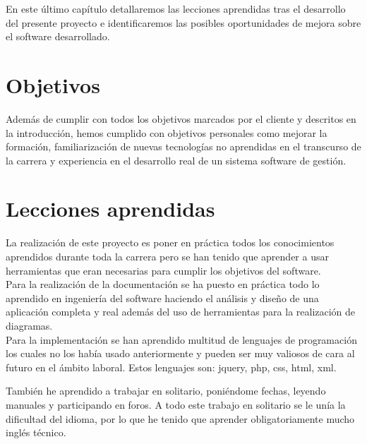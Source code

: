 

En este último capítulo detallaremos las lecciones aprendidas tras el desarrollo del presente proyecto e identificaremos las posibles oportunidades de mejora sobre el software desarrollado.

\section{Objetivos}

Además de cumplir con todos los objetivos marcados por el cliente y descritos en la introducción, hemos cumplido con objetivos personales como mejorar la formación, familiarización de nuevas tecnologías no aprendidas en el transcurso de la carrera y experiencia en el desarrollo real de un sistema software de gestión. 

\section{Lecciones aprendidas}

La realización de este proyecto es poner en práctica todos los conocimientos aprendidos durante toda la carrera pero se han tenido que aprender a usar herramientas que eran necesarias para cumplir los objetivos del software.\\

Para la realización de la documentación se ha puesto en práctica todo lo aprendido en ingeniería del software haciendo el análisis y diseño de una aplicación completa y real además del uso de herramientas para la realización de diagramas.\\

Para la implementación se han aprendido multitud de lenguajes de programación los cuales no los había usado anteriormente y pueden ser muy valiosos de cara al futuro en el ámbito laboral. Estos lenguajes son: jquery, php, css, html, xml.

También he aprendido a trabajar en solitario, poniéndome fechas, leyendo manuales y participando en foros. A todo este trabajo en solitario se le unía la dificultad del idioma, por lo que he tenido que aprender obligatoriamente mucho inglés técnico.

